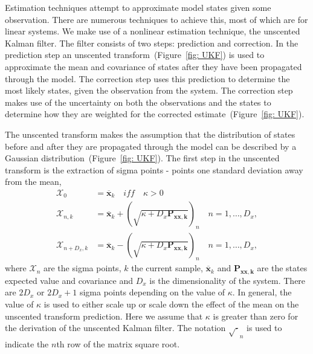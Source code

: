 
Estimation techniques attempt to approximate model states given some observation. There are numerous techniques to achieve this, most of which are for linear systems. We make use of a nonlinear estimation technique, the unscented Kalman filter. The filter consists of two steps: prediction and correction. In the prediction step an unscented transform~(Figure~\ref{fig: UKF}) is used to approximate the mean and covariance of states after they have been propagated through the model. The correction step uses this prediction to determine the most likely states, given the observation from the system. The correction step makes use of the uncertainty on both the observations and the states to determine how they are weighted for the corrected estimate~(Figure~\ref{fig: UKF}).

The unscented transform makes the assumption that the distribution of states before and after they are propagated through the model can be described by a Gaussian distribution~(Figure~\ref{fig: UKF}). The first step in the unscented transform is the extraction of sigma points - points one standard deviation away from the mean, 
\begin{align}\label{eqn: SigmaP}
\mathbf{\mathcal{X}}_{0} &= \mathbf{\overline{x}}_{k} \quad iff \quad \kappa >0\\
\mathbf{\mathcal{X}}_{n,k} &= \mathbf{\overline{x}}_{k} + (\sqrt{\kappa+D_{x}\mathbf{P_{xx,k}}})_{n} \quad n=1,\hdots,D_x,\\
\mathbf{\mathcal{X}}_{n+D_x,k} &= \mathbf{\overline{x}}_{k} - (\sqrt{\kappa+D_{x}\mathbf{P_{xx,k}}})_{n} \quad n=1,\hdots,D_x,
\end{align} where $\mathbf{\mathcal{X}}_{n}$ are the sigma points, $k$ the current sample, $\mathbf{\overline{x}}_{k}$ and $\mathbf{P_{xx,k}}$ are the states expected value and covariance and $D_{x}$ is the dimensionality of the system. There are $2D_x$ or $2D_{x}+1$ sigma points depending on the value of $\kappa$. In general, the value of $\kappa$ is used to either scale up or scale down the effect of the mean on the unscented transform prediction. Here we assume that $\kappa$ is greater than zero for the derivation of the unscented Kalman filter. The notation $\sqrt{\cdot}_{n}$ is used to indicate the $n$th row of the matrix square root. 

